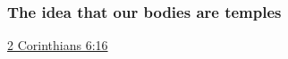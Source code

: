 	
		
	\subsubsection{The idea that our bodies are temples}
		\label{TEMPLE-body}
		
		\begin{compactitem}
			\item \hyperref[2CORINTHIANS-6-16]{2 Corinthians 6:16}
		\end{compactitem}